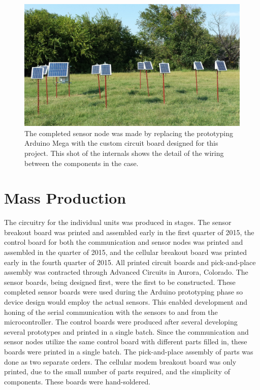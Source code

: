 \documentclass[journal]{IEEEtran}
\begin{document}
\begin{figure}[!t]
	\centering
	\includegraphics[width=.8\columnwidth,height=0.8\columnwidth,keepaspectratio]{testdeploy2.jpg}
	\caption[Internals of sensor node]{The completed sensor node was made by replacing the prototyping Arduino Mega with the custom circuit board designed for this project.  This shot of the internals shows the detail of the wiring between the components in the case.\label{fig:testdeploy2}}
\end{figure}

\section{Mass Production}

The circuitry for the individual units was produced in stages.  The sensor breakout board was printed and assembled early in the first quarter of 2015, the control board for both the communication and sensor nodes was printed and assembled in the  quarter of 2015, and the cellular breakout board was printed early in the fourth quarter of 2015.  All printed circuit boards and pick-and-place assembly was contracted through Advanced Circuits in Aurora, Colorado.  The sensor boards, being designed first, were the first to be constructed.  These completed sensor boards were used during the Arduino prototyping phase so device design would employ the actual sensors.  This enabled development and honing of the serial communication with the sensors to and from the microcontroller.  The control boards were produced after several developing several prototypes and printed in a single batch.  Since the communication and sensor nodes utilize the same control board with different parts filled in, these boards were printed in a single batch.  The pick-and-place assembly of parts was done as two separate orders.  The cellular modem breakout board was only printed, due to the small number of parts required, and the simplicity of components.  These boards were hand-soldered.
\end{document}
